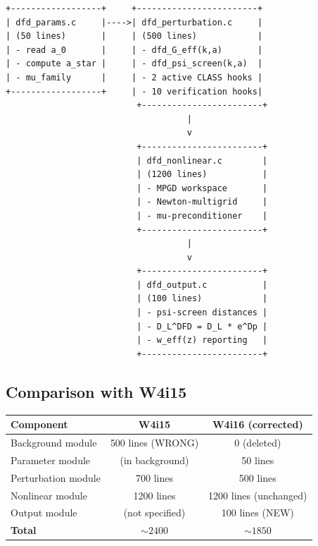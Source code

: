 \documentclass[11pt]{article}
\theoremstyle{definition}
\theoremstyle{remark}
\begin{document}
\begin{verbatim}
+------------------+     +------------------------+
| dfd_params.c     |---->| dfd_perturbation.c     |
| (50 lines)       |     | (500 lines)            |
| - read a_0       |     | - dfd_G_eff(k,a)       |
| - compute a_star |     | - dfd_psi_screen(k,a)  |
| - mu_family      |     | - 2 active CLASS hooks |
+------------------+     | - 10 verification hooks|
                          +------------------------+
                                    |
                                    v
                          +------------------------+
                          | dfd_nonlinear.c        |
                          | (1200 lines)           |
                          | - MPGD workspace       |
                          | - Newton-multigrid     |
                          | - mu-preconditioner    |
                          +------------------------+
                                    |
                                    v
                          +------------------------+
                          | dfd_output.c           |
                          | (100 lines)            |
                          | - psi-screen distances |
                          | - D_L^DFD = D_L * e^Dp |
                          | - w_eff(z) reporting   |
                          +------------------------+
\end{verbatim}

\subsection{Comparison with W4i15}

\begin{center}
\begin{tabular}{@{}lcc@{}}
\toprule
\textbf{Component} & \textbf{W4i15} & \textbf{W4i16 (corrected)} \\
\midrule
Background module & 500 lines (WRONG) & 0 (deleted) \\
Parameter module & (in background) & 50 lines \\
Perturbation module & 700 lines & 500 lines \\
Nonlinear module & 1200 lines & 1200 lines (unchanged) \\
Output module & (not specified) & 100 lines (NEW) \\
\midrule
\textbf{Total} & $\sim 2400$ & $\sim 1850$ \\
\bottomrule
\end{tabular}
\end{center}
\end{document}

